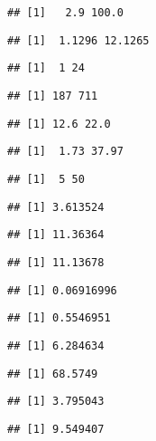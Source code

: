 \documentclass[
]{article}
\begin{document}
\begin{verbatim}
## [1]   2.9 100.0
\end{verbatim}

\begin{verbatim}
## [1]  1.1296 12.1265
\end{verbatim}

\begin{verbatim}
## [1]  1 24
\end{verbatim}

\begin{verbatim}
## [1] 187 711
\end{verbatim}

\begin{verbatim}
## [1] 12.6 22.0
\end{verbatim}

\begin{verbatim}
## [1]  1.73 37.97
\end{verbatim}

\begin{verbatim}
## [1]  5 50
\end{verbatim}

\begin{verbatim}
## [1] 3.613524
\end{verbatim}

\begin{verbatim}
## [1] 11.36364
\end{verbatim}

\begin{verbatim}
## [1] 11.13678
\end{verbatim}

\begin{verbatim}
## [1] 0.06916996
\end{verbatim}

\begin{verbatim}
## [1] 0.5546951
\end{verbatim}

\begin{verbatim}
## [1] 6.284634
\end{verbatim}

\begin{verbatim}
## [1] 68.5749
\end{verbatim}

\begin{verbatim}
## [1] 3.795043
\end{verbatim}

\begin{verbatim}
## [1] 9.549407
\end{verbatim}
\end{document}
